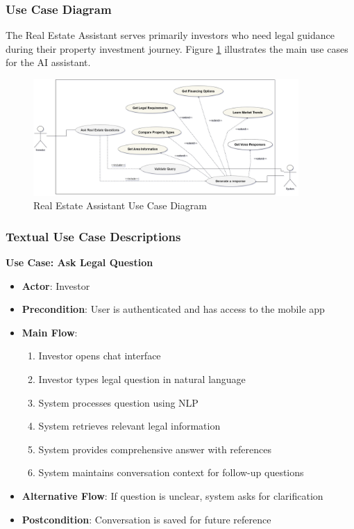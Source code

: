 \subsubsection{Use Case Diagram}
The Real Estate Assistant serves primarily investors who need legal guidance during their property investment journey. Figure \ref{fig:assistant-use-case} illustrates the main use cases for the AI assistant.
\newpage
\begin{figure}[htbp]
    \centering
    \includegraphics[width=0.9\textwidth]{images/assistant_use_case_diagram.png}
    \caption{Real Estate Assistant Use Case Diagram}
    \label{fig:assistant-use-case}
\end{figure}

\subsubsection{Textual Use Case Descriptions}

\textbf{Use Case: Ask Legal Question}
\begin{itemize}
    \item \textbf{Actor}: Investor
    \item \textbf{Precondition}: User is authenticated and has access to the mobile app
    \item \textbf{Main Flow}: 
    \begin{enumerate}
        \item Investor opens chat interface
        \item Investor types legal question in natural language
        \item System processes question using NLP
        \item System retrieves relevant legal information
        \item System provides comprehensive answer with references
        \item System maintains conversation context for follow-up questions
    \end{enumerate}
    \item \textbf{Alternative Flow}: If question is unclear, system asks for clarification
    \item \textbf{Postcondition}: Conversation is saved for future reference
\end{itemize}

